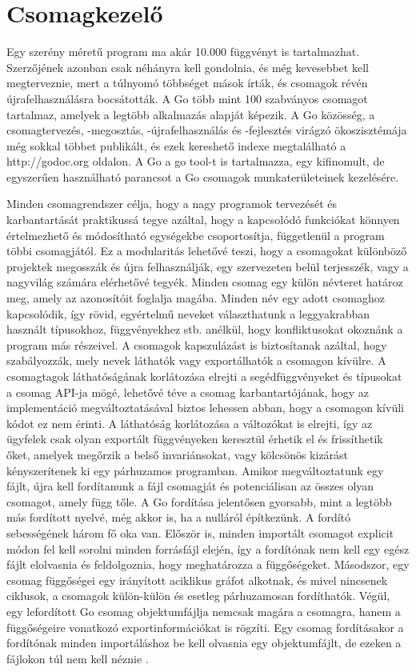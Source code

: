\section{Csomagkezelő}
Egy szerény méretű program ma akár 10.000 függvényt is tartalmazhat.
Szerzőjének azonban csak néhányra kell gondolnia, és még kevesebbet kell megterveznie, mert a túlnyomó többséget mások írták, és csomagok révén újrafelhasználásra bocsátották.
A Go több mint 100 szabványos csomagot tartalmaz, amelyek a legtöbb alkalmazás alapját képezik.
A Go közösség, a csomagtervezés, -megosztás, -újrafelhasználás és -fejlesztés virágzó ökoszisztémája még sokkal többet publikált, és ezek kereshető indexe megtalálható a http://godoc.org oldalon.
A Go a go tool-t is tartalmazza, egy kifinomult, de egyszerűen használható parancsot a Go csomagok munkaterületeinek kezelésére.

Minden csomagrendszer célja, hogy a nagy programok tervezését és karbantartását praktikussá tegye azáltal, hogy a kapcsolódó funkciókat könnyen értelmezhető és módosítható egységekbe csoportosítja, függetlenül a program többi csomagjától.
Ez a modularitás lehetővé teszi, hogy a csomagokat különböző projektek megosszák és újra felhasználják, egy szervezeten belül terjesszék, vagy a nagyvilág számára elérhetővé tegyék.
Minden csomag egy külön névteret határoz meg, amely az azonosítóit foglalja magába.
Minden név egy adott csomaghoz kapcsolódik, így rövid, egyértelmű neveket választhatunk a leggyakrabban használt típusokhoz, függvényekhez stb. anélkül, hogy konfliktusokat okoznánk a program más részeivel.
A csomagok kapszulázást is biztosítanak azáltal, hogy szabályozzák, mely nevek láthatók vagy exportálhatók a csomagon kívülre.
A csomagtagok láthatóságának korlátozása elrejti a segédfüggvényeket és típusokat a csomag API-ja mögé, lehetővé téve a csomag karbantartójának, hogy az implementáció megváltoztatásával biztos lehessen abban, hogy a csomagon kívüli kódot ez nem érinti.
A láthatóság korlátozása a változókat is elrejti, így az ügyfelek csak olyan exportált függvényeken keresztül érhetik el és frissíthetik őket, amelyek megőrzik a belső invariánsokat, vagy kölcsönös kizárást kényszerítenek ki egy párhuzamos programban.
Amikor megváltoztatunk egy fájlt, újra kell fordítanunk a fájl csomagját és potenciálisan az összes olyan csomagot, amely függ tőle.
A Go fordítása jelentősen gyorsabb, mint a legtöbb más fordított nyelvé, még akkor is, ha a nulláról építkezünk.
A fordító sebességének három fő oka van.
Először is, minden importált csomagot explicit módon fel kell sorolni minden forrásfájl elején, így a fordítónak nem kell egy egész fájlt elolvasnia és feldolgoznia, hogy meghatározza a függőségeket.
Másodszor, egy csomag függőségei egy irányított aciklikus gráfot alkotnak, és mivel nincsenek ciklusok, a csomagok külön-külön és esetleg párhuzamosan fordíthatók.
Végül, egy lefordított Go csomag objektumfájlja nemcsak magára a csomagra, hanem a függőségeire vonatkozó exportinformációkat is rögzíti.
Egy csomag fordításakor a fordítónak minden importáláshoz be kell olvasnia egy objektumfájlt, de ezeken a fájlokon túl nem kell néznie \cite{Alan15}.

